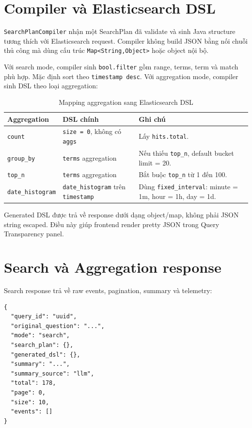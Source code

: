 \documentclass[12pt,a4paper]{report}
\begin{document}
\section{Compiler và Elasticsearch DSL}

\texttt{SearchPlanCompiler} nhận một SearchPlan đã validate và sinh Java structure tương thích với Elasticsearch request. Compiler không build JSON bằng nối chuỗi thủ công mà dùng cấu trúc \texttt{Map<String,Object>} hoặc object nội bộ.

Với search mode, compiler sinh \texttt{bool.filter} gồm range, terms, term và match phù hợp. Mặc định sort theo \texttt{timestamp desc}. Với aggregation mode, compiler sinh DSL theo loại aggregation:

\begin{table}[H]
\centering
\caption{Mapping aggregation sang Elasticsearch DSL}
\small
\begin{tabularx}{\textwidth}{p{2.8cm}p{4.0cm}Y}
\toprule
\textbf{Aggregation} & \textbf{DSL chính} & \textbf{Ghi chú} \\
\midrule
\texttt{count} & \texttt{size = 0}, không có \texttt{aggs} & Lấy \texttt{hits.total}. \\
\texttt{group\_by} & \texttt{terms} aggregation & Nếu thiếu \texttt{top\_n}, default bucket limit = 20. \\
\texttt{top\_n} & \texttt{terms} aggregation & Bắt buộc \texttt{top\_n} từ 1 đến 100. \\
\texttt{date\_histogram} & \texttt{date\_histogram} trên \texttt{timestamp} & Dùng \texttt{fixed\_interval}: minute = 1m, hour = 1h, day = 1d. \\
\bottomrule
\end{tabularx}
\end{table}

Generated DSL được trả về response dưới dạng object/map, không phải JSON string escaped. Điều này giúp frontend render pretty JSON trong Query Transparency panel.

\section{Search và Aggregation response}

Search response trả về raw events, pagination, summary và telemetry:

\begin{lstlisting}[caption={Schema rút gọn của natural language search response}]
{
  "query_id": "uuid",
  "original_question": "...",
  "mode": "search",
  "search_plan": {},
  "generated_dsl": {},
  "summary": "...",
  "summary_source": "llm",
  "total": 178,
  "page": 0,
  "size": 10,
  "events": []
}
\end{lstlisting}
\end{document}
